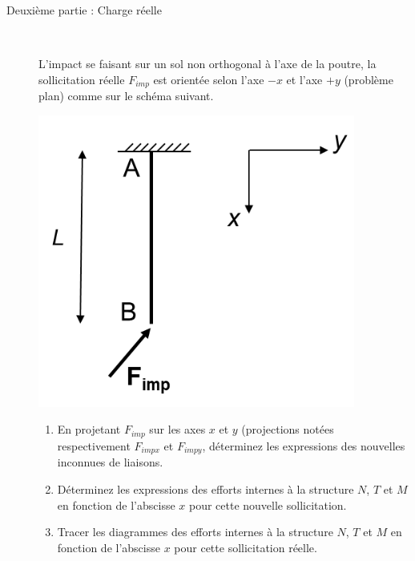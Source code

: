 \documentclass[lecture.tex]{subfiles}
\begin{document}
\begin{description}
  \item[Deuxième partie : Charge réelle] \ \par
  L’impact se faisant sur un sol non orthogonal à l’axe de la poutre, la sollicitation réelle $F_{imp}$ est orientée selon l’axe $-x$ et l’axe $+y$ (problème plan) comme sur le schéma suivant.
  \begin{center}
    \includegraphics[scale=0.4]{figD0026.png}
  \end{center}
  \begin{enumerate}
    \item En projetant $F_{imp}$ sur les axes $x$ et $y$ (projections notées respectivement $F_{impx}$ et $F_{impy}$, déterminez les expressions des nouvelles inconnues de liaisons.
    \item Déterminez les expressions des efforts internes à la structure $N$, $T$ et $M$ en fonction de l'abscisse $x$ pour cette nouvelle sollicitation.
    \item Tracer les diagrammes des efforts internes à la structure $N$, $T$ et $M$ en fonction de l'abscisse $x$ pour cette sollicitation réelle.
  \end{enumerate}

\end{description}

\finexercice
\end{document}
